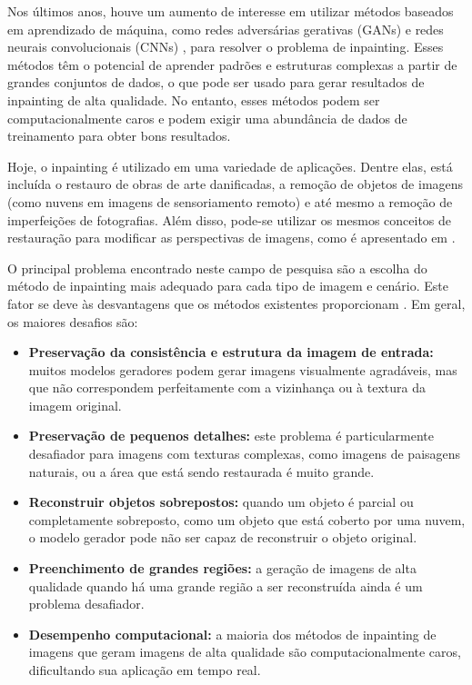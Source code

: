 Nos últimos anos, houve um aumento de interesse em utilizar métodos baseados em aprendizado de máquina, como redes adversárias gerativas (GANs) e redes neurais convolucionais (CNNs) \cite{pathakCVPR16context}, para resolver o problema de inpainting. Esses métodos têm o potencial de aprender padrões e estruturas complexas a partir de grandes conjuntos de dados, o que pode ser usado para gerar resultados de inpainting de alta qualidade. No entanto, esses métodos podem ser computacionalmente caros e podem exigir uma abundância de dados de treinamento para obter bons resultados.

Hoje, o inpainting é utilizado em uma variedade de aplicações. Dentre elas, está incluída o restauro de obras de arte danificadas, a remoção de objetos de imagens (como nuvens em imagens de sensoriamento remoto) e até mesmo a
remoção de imperfeições de fotografias. Além disso, pode-se utilizar os mesmos conceitos de restauração para modificar as perspectivas de imagens, como é apresentado em \cite{huang2014image}.

O principal problema encontrado neste campo de pesquisa são a escolha do método de inpainting mais adequado para cada tipo de imagem e cenário. Este fator se deve às desvantagens que os métodos existentes proporcionam \cite{Salem2021}. Em geral, os maiores desafios são:
\begin{itemize} 
  \item \textbf{Preservação da consistência e estrutura da imagem de entrada:} muitos modelos geradores podem gerar imagens visualmente agradáveis, mas que não correspondem perfeitamente com a vizinhança ou à textura da imagem original.
  \item \textbf{Preservação de pequenos detalhes:} este problema é particularmente desafiador para imagens com texturas complexas, como imagens de paisagens naturais, ou a área que está sendo restaurada é muito grande.
  \item \textbf{Reconstruir objetos sobrepostos:} quando um objeto é parcial ou completamente sobreposto, como um objeto que está coberto por uma nuvem, o modelo gerador pode não ser capaz de reconstruir o objeto original.
  \item \textbf{Preenchimento de grandes regiões:} a geração de imagens de alta qualidade quando há uma grande região a ser reconstruída ainda é um problema desafiador.
  \item \textbf{Desempenho computacional:} a maioria dos métodos de inpainting de imagens que geram imagens de alta qualidade são computacionalmente caros, dificultando sua aplicação em tempo real.
\end{itemize}

